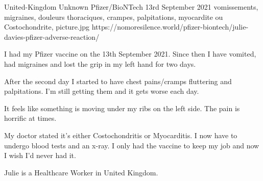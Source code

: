           {United-Kingdom}
          {Unknown}
          {Pfizer/BioNTech}
          {13rd September 2021}
          {
            vomissements,
            migraines,
            douleurs thoraciques,
            crampes,
            palpitations,
            myocardite ou Costochondrite,
          }
          {picture.jpg}
          {https://nomoresilence.world/pfizer-biontech/julie-davies-pfizer-adverse-reaction/}
          {
            

I had my Pfizer vaccine on the 13th September 2021. Since then I have vomited,
had migraines and lost the grip in my left hand for two days.

After the second day I started to have chest pains/cramps fluttering and
palpitations. I’m still getting them and it gets worse each day.

It feels like something is moving under my ribs on the left side. The pain is
horrific at times.

My doctor stated it’s either Costochondritis or Myocarditis. I now have to
undergo blood tests and an x-ray. I only had the vaccine to keep my job and now
I wish I’d never had it.

Julie is a Healthcare Worker in United Kingdom.

}
